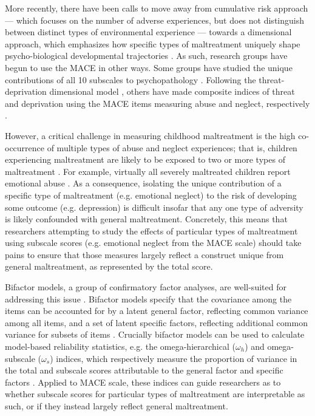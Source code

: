 \documentclass[letterpaper,man,natbib]{apa6}  %
\begin{document}
More recently, there have been calls to move away from cumulative risk approach \citep{evans2013cumulative} --- which focuses on the number of adverse experiences, but does not distinguish between distinct types of environmental experience --- towards a dimensional approach, which emphasizes how specific types of maltreatment uniquely shape psycho-biological developmental trajectories \citep{mclaughlin2016beyond, belsky2012beyond}. As such, research groups have begun to use the MACE in other ways. Some groups have studied the unique contributions of all 10 subscales to psychopathology \citep{schalinski2015type, gerke2018childhood, schalinski2019early}. Following the threat-deprivation dimensional model \citep{mclaughlin2014childhood}, others have made composite indices of threat and deprivation using the MACE items measuring abuse and neglect, respectively \citep{schalinski2018defining, schalinski2019environmental, teicher2018differential}.

However, a critical challenge in measuring childhood maltreatment is the high co-occurrence of multiple types of abuse and neglect experiences; that is, children experiencing maltreatment are likely to be exposed to two or more types of maltreatment \citep{green2010childhood, mclaughlin2012childhood, marques2021risk, mersky2017rethinking}. For example, virtually all severely maltreated children report emotional abuse \citep{mcgee1995measurement}. As a consequence, isolating the unique contribution of a specific type of maltreatment (e.g. emotional neglect) to the risk of developing some outcome (e.g. depression) is difficult insofar that any one type of adversity is likely confounded with general maltreatment. Concretely, this means that researchers attempting to study the effects of particular types of maltreatment using subscale scores (e.g. emotional neglect from the MACE scale) should take pains to ensure that those measures largely reflect a construct unique from general maltreatment, as represented by the total score.

Bifactor models, a group of confirmatory factor analyses, are well-suited for addressing this issue \citep{bornovalova2020appropriate}. Bifactor models specify that the covariance among the items can be accounted for by a latent general factor, reflecting common variance among all items, and a set of latent specific factors, reflecting additional common variance for subsets of items \citep{Reise2012-ql}. Crucially bifactor models can be used to calculate model-based reliability statistics, e.g. the omega-hierarchical ($\omega_h$) and omega-subscale ($\omega_s$) indices, which respectively measure the proportion of variance in the total and subscale scores attributable to the general factor and specific factors \citep{reise2013applying, rodriguez2016evaluating}. Applied to MACE scale, these indices can guide researchers as to whether subscale scores for particular types of maltreatment are interpretable as such, or if they instead largely reflect general maltreatment. 
\end{document}
